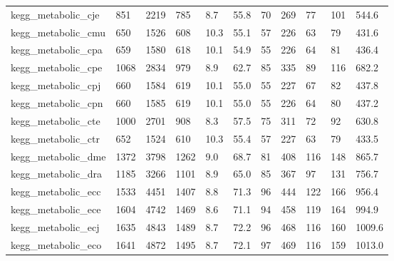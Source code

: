 \begin{longtable}{lllllllllll}
 kegg\_metabolic\_cje                                 & 851        & 2219      & 785   & 8.7    & 55.8   & 70    & 269    & 77     & 101    & 544.6   \\
 kegg\_metabolic\_cmu                                 & 650        & 1526      & 608   & 10.3   & 55.1   & 57    & 226    & 63     & 79     & 431.6   \\
 kegg\_metabolic\_cpa                                 & 659        & 1580      & 618   & 10.1   & 54.9   & 55    & 226    & 64     & 81     & 436.4   \\
 kegg\_metabolic\_cpe                                 & 1068       & 2834      & 979   & 8.9    & 62.7   & 85    & 335    & 89     & 116    & 682.2   \\
 kegg\_metabolic\_cpj                                 & 660        & 1584      & 619   & 10.1   & 55.0   & 55    & 227    & 67     & 82     & 437.8   \\
 kegg\_metabolic\_cpn                                 & 660        & 1585      & 619   & 10.1   & 55.0   & 55    & 226    & 64     & 80     & 437.2   \\
 kegg\_metabolic\_cte                                 & 1000       & 2701      & 908   & 8.3    & 57.5   & 75    & 311    & 72     & 92     & 630.8   \\
 kegg\_metabolic\_ctr                                 & 652        & 1524      & 610   & 10.3   & 55.4   & 57    & 227    & 63     & 79     & 433.5   \\
 kegg\_metabolic\_dme                                 & 1372       & 3798      & 1262  & 9.0    & 68.7   & 81    & 408    & 116    & 148    & 865.7   \\
 kegg\_metabolic\_dra                                 & 1185       & 3266      & 1101  & 8.9    & 65.0   & 85    & 367    & 97     & 131    & 756.7   \\
 kegg\_metabolic\_ecc                                 & 1533       & 4451      & 1407  & 8.8    & 71.3   & 96    & 444    & 122    & 166    & 956.4   \\
 kegg\_metabolic\_ece                                 & 1604       & 4742      & 1469  & 8.6    & 71.1   & 94    & 458    & 119    & 164    & 994.9   \\
 kegg\_metabolic\_ecj                                 & 1635       & 4843      & 1489  & 8.7    & 72.2   & 96    & 468    & 116    & 160    & 1009.6  \\
 kegg\_metabolic\_eco                                 & 1641       & 4872      & 1495  & 8.7    & 72.1   & 97    & 469    & 116    & 159    & 1013.0  \\

\end{longtable}
